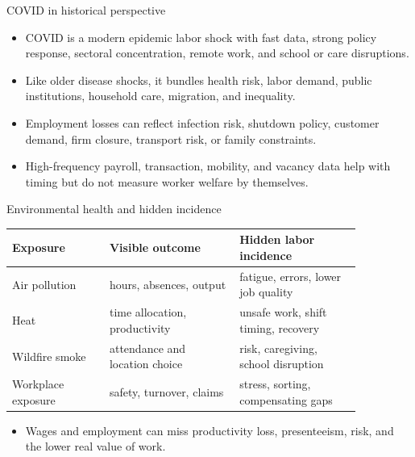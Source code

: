 \documentclass[aspectratio=169,11pt]{beamer}
\begin{document}
\begin{frame}{COVID in historical perspective}
\begin{itemize}
    \item COVID is a modern epidemic labor shock with fast data, strong policy response, sectoral concentration, remote work, and school or care disruptions.
    \item Like older disease shocks, it bundles health risk, labor demand, public institutions, household care, migration, and inequality.
    \item Employment losses can reflect infection risk, shutdown policy, customer demand, firm closure, transport risk, or family constraints.
    \item High-frequency payroll, transaction, mobility, and vacancy data help with timing but do not measure worker welfare by themselves.
\end{itemize}
\end{frame}

\begin{frame}{Environmental health and hidden incidence}
\small
\begin{tabular}{p{0.24\linewidth} p{0.32\linewidth} p{0.30\linewidth}}
\toprule
Exposure & Visible outcome & Hidden labor incidence \\
\midrule
Air pollution & hours, absences, output & fatigue, errors, lower job quality \\
Heat & time allocation, productivity & unsafe work, shift timing, recovery \\
Wildfire smoke & attendance and location choice & risk, caregiving, school disruption \\
Workplace exposure & safety, turnover, claims & stress, sorting, compensating gaps \\
\bottomrule
\end{tabular}
\vspace{0.25cm}
\begin{itemize}
    \item Wages and employment can miss productivity loss, presenteeism, risk, and the lower real value of work.
\end{itemize}
\end{frame}
\end{document}
